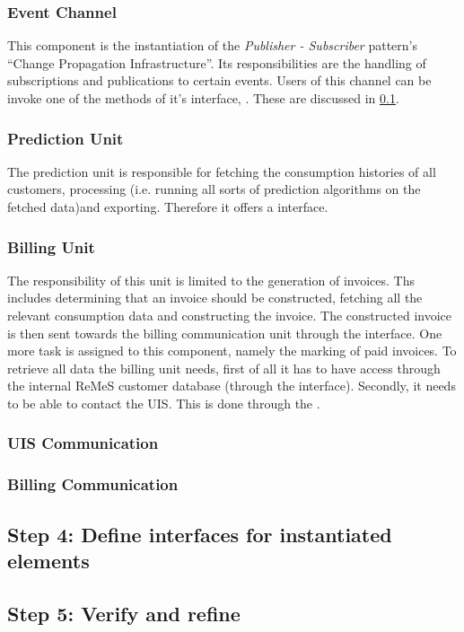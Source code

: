 \subsubsection{Event Channel}

\npar This component is the instantiation of the \emph{Publisher - Subscriber}
pattern's ``Change Propagation Infrastructure''. Its responsibilities are the
handling of subscriptions and publications to certain events. Users of this
channel can be invoke one of the methods of it's interface,
. These are discussed in \ref{add:it8/interfaces}.

\subsubsection{Prediction Unit}

\npar The prediction unit is responsible for fetching the consumption
histories of all customers, processing (i.e. running all sorts of
prediction algorithms on the fetched data)and exporting. Therefore it offers a
 interface.

\subsubsection{Billing Unit}

\npar The responsibility of this unit is limited to the generation of invoices.
Ths includes determining that an invoice should be constructed, fetching all the
relevant consumption data and constructing the invoice. The constructed invoice
is then sent towards the billing communication unit through the
 interface. One more task is assigned to this
component, namely the marking of paid invoices. To retrieve all data the
billing unit needs, first of all it has to have access through the internal
ReMeS customer database (through the  interface).
Secondly, it needs to be able to contact the UIS. This is done through the
.

\subsubsection{UIS Communication}

\subsubsection{Billing Communication}

\subsection{Step 4: Define interfaces for instantiated elements}
\label{add:it8/interfaces}

\subsection{Step 5: Verify and refine}
\label{add:it8/verification}